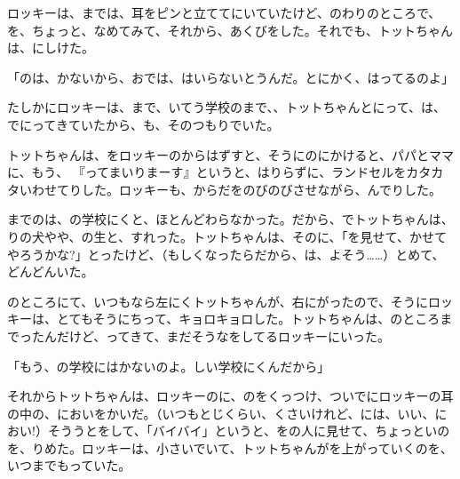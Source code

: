 ロッキーは、までは、耳をピンと立ててにいていたけど、のわりのところで、を、ちょっと、なめてみて、それから、あくびをした。それでも、トットちゃんは、にしけた。

「のは、かないから、おでは、はいらないとうんだ。とにかく、はってるのよ」

たしかにロッキーは、まで、いてう学校のまで、、トットちゃんとにって、は、でにってきていたから、も、そのつもりでいた。

トットちゃんは、をロッキーのからはずすと、そうにのにかけると、パパとママに、もう、 『ってまいりまーす』というと、はりらずに、ランドセルをカタカタいわせてりした。ロッキーも、からだをのびのびさせながら、んでりした。

までのは、の学校にくと、ほとんどわらなかった。だから、でトットちゃんは、りの犬やや、の生と、すれった。トットちゃんは、そのに、「を見せて、かせてやろうかな?」とったけど、（もしくなったらだから、は、よそう……）とめて、どんどんいた。

のところにて、いつもなら左にくトットちゃんが、右にがったので、そうにロッキーは、とてもそうにちって、キョロキョロした。トットちゃんは、のところまでったんだけど、ってきて、まだそうなをしてるロッキーにいった。

「もう、の学校にはかないのよ。しい学校にくんだから」

それからトットちゃんは、ロッキーのに、のをくっつけ、ついでにロッキーの耳の中の、においをかいだ。（いつもとじくらい、くさいけれど、には、いい、におい!）そううとをして、「バイバイ」というと、をの人に見せて、ちょっといのを、りめた。ロッキーは、小さいでいて、トットちゃんがを上がっていくのを、いつまでもっていた。


